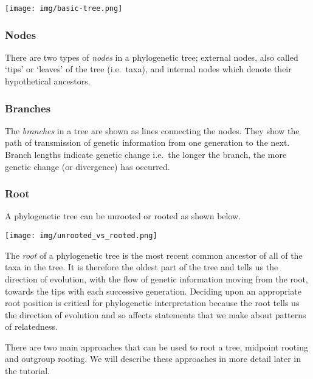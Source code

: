 \documentclass[11pt]{article}
\begin{document}
\begin{center}
\texttt{[image: img/basic-tree.png]}
\end{center}


\hypertarget{nodes}{%
\subsubsection{Nodes}\label{nodes}}

There are two types of \textit{nodes} in a phylogenetic tree; external
nodes, also called `tips' or `leaves' of the tree (i.e.~taxa), and
internal nodes which denote their hypothetical ancestors.

\hypertarget{branches}{%
\subsubsection{Branches}\label{branches}}

The \textit{branches} in a tree are shown as lines connecting the nodes.
They show the path of transmission of genetic information from one
generation to the next. Branch lengths indicate genetic change i.e.~the
longer the branch, the more genetic change (or divergence) has occurred.

\hypertarget{root}{%
\subsubsection{Root}\label{root}}

A phylogenetic tree can be unrooted or rooted as shown below.


\begin{center}
\texttt{[image: img/unrooted\_vs\_rooted.png]}
\end{center}


The \textit{root} of a phylogenetic tree is the most recent common
ancestor of all of the taxa in the tree. It is therefore the oldest part
of the tree and tells us the direction of evolution, with the flow of
genetic information moving from the root, towards the tips with each
successive generation. Deciding upon an appropriate root position is
critical for phylogenetic interpretation because the root tells us the
direction of evolution and so affects statements that we make about
patterns of relatedness.

There are two main approaches that can be used to root a tree, midpoint
rooting and outgroup rooting. We will describe these approaches in more
detail later in the tutorial.
\end{document}
